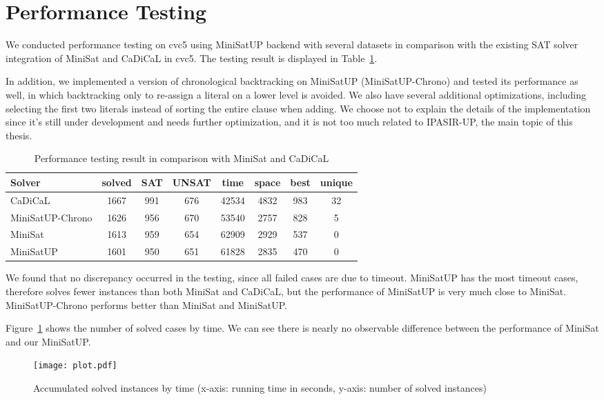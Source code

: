 \section{Performance Testing}

We conducted performance testing on cvc5 using MiniSatUP backend with several datasets in comparison with the existing SAT solver integration of MiniSat and CaDiCaL in cvc5. The testing result is displayed in Table~\ref{tab:perf}.

In addition, we implemented a version of chronological backtracking on MiniSatUP (MiniSatUP-Chrono) and tested its performance as well, in which backtracking only to re-assign a literal on a lower level is avoided. We also have several additional optimizations, including selecting the first two literals instead of sorting the entire clause when adding. We choose not to explain the details of the implementation since it's still under development and needs further optimization, and it is not too much related to IPASIR-UP, the main topic of this thesis.

\begin{table}[!htbp]
  \centering
  \begin{tabular}{lccccccc}
    \hline
    Solver & solved & SAT & UNSAT & time & space & best & unique \\
    \hline
    CaDiCaL          & 1667 & 991 & 676 & 42534 & 4832 & 983 & 32 \\
    MiniSatUP-Chrono & 1626 & 956 & 670 & 53540 & 2757 & 828 & 5 \\
    MiniSat          & 1613 & 959 & 654 & 62909 & 2929 & 537 & 0 \\
    MiniSatUP        & 1601 & 950 & 651 & 61828 & 2835 & 470 & 0 \\
    \hline
  \end{tabular}
  \caption{Performance testing result in comparison with MiniSat and CaDiCaL}
  \label{tab:perf}
\end{table}

We found that no discrepancy occurred in the testing, since all failed cases are due to timeout. MiniSatUP has the most timeout cases, therefore solves fewer instances than both MiniSat and CaDiCaL, but the performance of MiniSatUP is very much close to MiniSat. MiniSatUP-Chrono performs better than MiniSat and MiniSatUP.

Figure~\ref{fig:cdf} shows the number of solved cases by time. We can see there is nearly no observable difference between the performance of MiniSat and our MiniSatUP.

\begin{figure}[h]
  \centering
  \texttt{[image: plot.pdf]}
  \caption{Accumulated solved instances by time (x-axis: running time in seconds, y-axis: number of solved instances)}
  \label{fig:cdf}
\end{figure}
